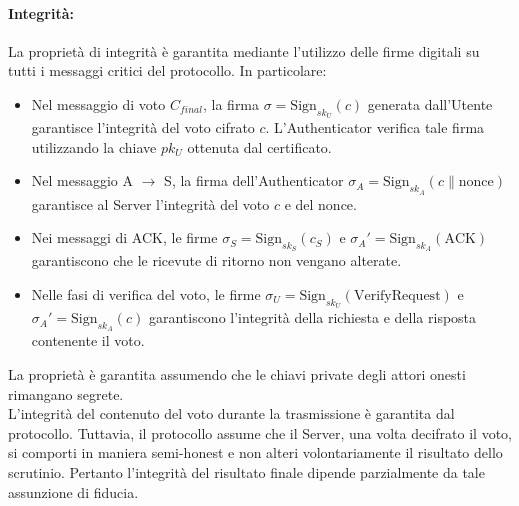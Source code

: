 \paragraph{Integrità:}
La proprietà di integrità è garantita mediante l'utilizzo delle firme digitali su tutti i messaggi critici del protocollo. In particolare:
\begin{itemize}
    \item Nel messaggio di voto $C_{final}$, la firma $\sigma = \text{Sign}_{sk_U}(c)$ generata dall'Utente garantisce l'integrità del voto cifrato $c$. L'Authenticator verifica tale firma utilizzando la chiave $pk_U$ ottenuta dal certificato.
    \item Nel messaggio A $\rightarrow$ S, la firma dell'Authenticator $\sigma_A = \text{Sign}_{sk_A}(c \| \text{nonce})$ garantisce al Server l'integrità del voto $c$ e del nonce.
    \item Nei messaggi di ACK, le firme $\sigma_S = \text{Sign}_{sk_S}(c_S)$ e $\sigma_A' = \text{Sign}_{sk_A}(\text{ACK})$ garantiscono che le ricevute di ritorno non vengano alterate.
    \item Nelle fasi di verifica del voto, le firme $\sigma_U = \text{Sign}_{sk_U}(\text{VerifyRequest})$ e $\sigma_A' = \text{Sign}_{sk_A}(c)$ garantiscono l'integrità della richiesta e della risposta contenente il voto.
\end{itemize}
La proprietà è garantita assumendo che le chiavi private degli attori onesti rimangano segrete. \\
L'integrità del contenuto del voto durante la trasmissione è garantita dal protocollo. Tuttavia, il protocollo assume che il Server, una volta decifrato il voto, si comporti in maniera semi-honest e non alteri volontariamente il risultato dello scrutinio. Pertanto l'integrità del risultato finale dipende parzialmente da tale assunzione di fiducia.

